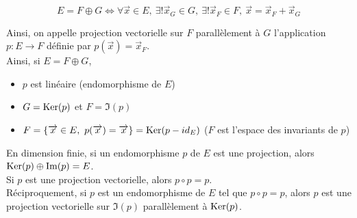     \[E = F \oplus G \iff \forall \vec x \in E,\ \exists ! \vec x_G \in G,\ \exists ! \vec x_F \in F,\ \vec x = \vec x_F + \vec x_G\]

    Ainsi, on appelle projection vectorielle sur $F$ parallèlement à $G$ l'application $p : E \to F$ définie par $p(\vec x) = \vec x_F$.\\

    Ainsi, si $E = F \oplus G$,
    \begin{itemize}
        \item $p$ est linéaire (endomorphisme de $E$)
        \item $G = \operatorname{Ker}(p)$ et $F = \Im(p)$
        \item $F = \left\{\overrightarrow x \in E,\ p(\overrightarrow x) = \overrightarrow x\right\} = \operatorname{Ker}(p - id_E)$ ($F$ est l'espace des invariants de $p$)
    \end{itemize}
    \vspace{10px}
    En dimension finie, si un endomorphisme $p$ de $E$ est une projection, alors $\operatorname{Ker}(p) \oplus \Im(p) = E$.\\

    Si $p$ est une projection vectorielle, alors $p \circ p = p$.\\
    Réciproquement, si $p$ est un endomorphisme de $E$ tel que $p \circ p = p$, alors $p$ est une projection vectorielle sur $\Im(p)$ parallèlement à $\operatorname{Ker}(p)$.\\
